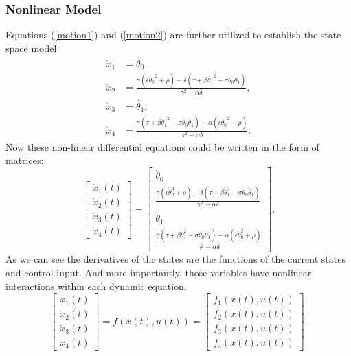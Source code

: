 \subsubsection{Nonlinear Model}
Equations (\ref{motion1}) and (\ref{motion2}) are further utilized to establish the state
space model
\begin{subequations}
	\begin{align}
	\dot{x}_1 &= \dot{\theta_0}, \\
	\dot{x}_2 &= \frac{\gamma(\epsilon\dot{\theta_0}^2+\rho)-\delta(\tau+\beta\dot{\theta_1}^2-\sigma\dot{\theta_0}\dot{\theta_1})}{\gamma^2-\alpha\delta},\\
	\dot{x}_3 &= \dot{\theta_1},\\
	\dot{x}_4 &= \frac{\gamma(\tau+\beta\dot{\theta_1}^2-\sigma\dot{\theta_0}\dot{\theta_1})-\alpha(\epsilon\dot{\theta_0}^2+\rho)}{\gamma^2-\alpha\delta}.
	\end{align}
\end{subequations}
Now these non-linear differential equations could be written in the form of matrices:
\begin{equation}\label{nonlinmodel}
\begin{bmatrix}
\dot{x}_1(t) \\ \dot{x}_2(t) \\ \dot{x}_3(t) \\ \dot{x}_4(t)
\end{bmatrix} = \begin{bmatrix}
\dot{\theta}_0\\
\frac{\gamma(\epsilon\dot{\theta}_0^2+\rho)-\delta(\tau+\beta\dot{\theta}_1^2-\sigma\dot{\theta}_0\dot{\theta}_1)}{\gamma^2-\alpha\delta}\\
\dot{\theta}_1\\
\frac{\gamma(\tau+\beta\dot{\theta}_1^2-\sigma\dot{\theta}_0\dot{\theta}_1)-\alpha(\epsilon\dot{\theta}_0^2+\rho)}{\gamma^2-\alpha\delta}
\end{bmatrix}.
\end{equation}
As we can see the derivatives of the states are the functions of the current states and control input. And more importantly, those variables have nonlinear interactions within each dynamic equation. 
\begin{equation}\begin{bmatrix}
\dot{x}_1(t) \\ \dot{x}_2(t) \\ \dot{x}_3(t) \\ \dot{x}_4(t)
\end{bmatrix} = f(x(t),u(t)) =\begin{bmatrix}f_1(x(t),u(t))\\f_2(x(t),u(t))\\f_3(x(t),u(t))\\f_4(x(t),u(t))\end{bmatrix}. \end{equation}
